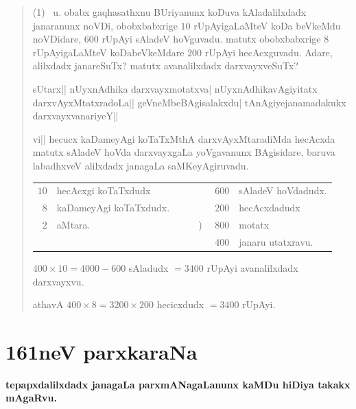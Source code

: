 \begin{verse}
{\rm(1)}~ u. obabx gaqhasathxnu BUriyanunx koDuva kAladalilxdadx
janaranunx noVDi, obobxbabxrige $10$ rUpAyigaLaMteV koDa beVkeMdu
noVDidare, $600$ rUpAyi sAladeV hoVguvadu. matutx obobxbabxrige $8$
rUpAyigaLaMteV koDabeVkeMdare $200$ rUpAyi hecAcxguvadu. Adare,
alilxdadx janareSuTx? matutx avanalilxdadx darxvayxveSuTx?

sUtarx|| nUyxnAdhika darxvayxmotatxva| nUyxnAdhikavAgiyitatx
darxvAyxMtatxradoLa|| geVneMbeBAgisalakxdu| tAnAgiyejanamadakukx
darxvayxvanariyeY|| 

vi|| hecucx kaDameyAgi koTaTxMthA darxvAyxMtaradiMda hecAcxda matutx
sAladeV hoVda darxvayxgaLa yoVgavanunx BAgisidare, baruva labadhxveV
alilxdadx janagaLa saMKeyAgiruvadu. 
\begin{center}
\begin{tabular}{rl@{}rl}
$10$ & hecAcxgi koTaTxdudx & $600$ & sAladeV hoVdadudx.\\[2pt]
$8$ & kaDameyAgi koTaTxdudx.~~~~ & $200$ & hecAcxdadudx\\[2pt]
\cline{1-1}
\cline{3-3}
$2$ & aMtara. & )~~ $800$ & motatx\\[2pt]
\cline{3-3}
    &         & $400$ &  janaru utatxravu. 
\end{tabular}
\end{center}
$400\times 10=4000-600$ sAladudx $=3400$ rUpAyi avanalilxdadx
darxvayxvu.

athavA $400\times 8=3200\times 200$ hecicxdudx $=3400$ rUpAyi.
\end{verse}

\chapter{161neV parxkaraNa}

\begin{center}
{\large\bf tepapxdalilxdadx janagaLa parxmANagaLanunx kaMDu hiDiya
takakx mAgaRvu.}
\end{center}

